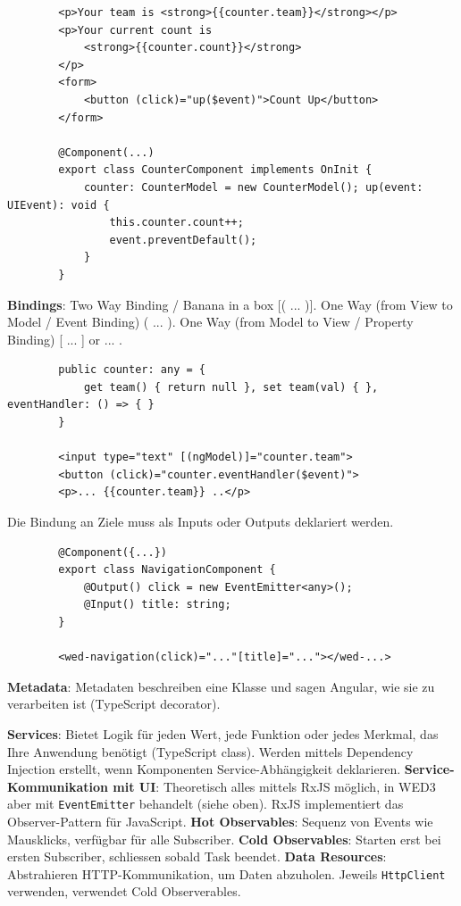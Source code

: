 \documentclass[10pt,landscape]{article}
\begin{document}
\begin{multicols}{2}
        \begin{lstlisting}
        <p>Your team is <strong>{{counter.team}}</strong></p>
        <p>Your current count is
            <strong>{{counter.count}}</strong>
        </p>
        <form>
            <button (click)="up($event)">Count Up</button>
        </form>

        @Component(...)
        export class CounterComponent implements OnInit {
            counter: CounterModel = new CounterModel(); up(event: UIEvent): void {
                this.counter.count++;
                event.preventDefault();
            }
        }
        \end{lstlisting}

        \textbf{Bindings}: Two Way Binding / Banana in a box [( ... )].
        One Way (from View to Model / Event Binding) ( ... ).
        One Way (from Model to View / Property Binding) [ ... ] or {{ ... }}.

        \begin{lstlisting}
        public counter: any = {
            get team() { return null }, set team(val) { }, eventHandler: () => { }
        }

        <input type="text" [(ngModel)]="counter.team">
        <button (click)="counter.eventHandler($event)">
        <p>... {{counter.team}} ..</p>
        \end{lstlisting}

        Die Bindung an Ziele muss als Inputs oder Outputs deklariert werden.

        \begin{lstlisting}
        @Component({...})
        export class NavigationComponent {
            @Output() click = new EventEmitter<any>();
            @Input() title: string;
        }

        <wed-navigation(click)="..."[title]="..."></wed-...>
        \end{lstlisting}

        \textbf{Metadata}: Metadaten beschreiben eine Klasse und sagen Angular, wie sie zu verarbeiten ist (TypeScript decorator).

        \textbf{Services}: Bietet Logik für jeden Wert, jede Funktion oder jedes Merkmal, das Ihre Anwendung benötigt (TypeScript class).
        Werden mittels Dependency Injection erstellt, wenn Komponenten Service-Abhängigkeit deklarieren.
        \textbf{Service-Kommunikation mit UI}: Theoretisch alles mittels RxJS möglich, in WED3 aber mit \lstinline{EventEmitter} behandelt (siehe oben).
        RxJS implementiert das Observer-Pattern für JavaScript.
        \textbf{Hot Observables}: Sequenz von Events wie Mausklicks, verfügbar für alle Subscriber.
        \textbf{Cold Observables}: Starten erst bei ersten Subscriber, schliessen sobald Task beendet.
        \textbf{Data Resources}: Abstrahieren HTTP-Kommunikation, um Daten abzuholen.
        Jeweils \lstinline{HttpClient} verwenden, verwendet Cold Observerables.


\end{multicols}
\end{document}
